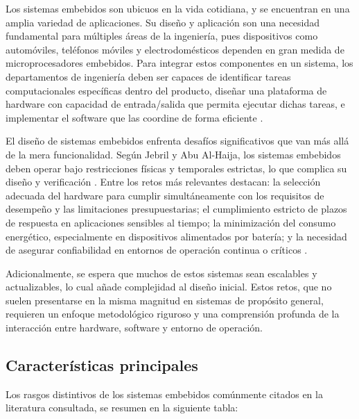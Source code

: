 Los sistemas embebidos son ubicuos en la vida cotidiana, y se encuentran en una amplia variedad de aplicaciones. Su diseño y aplicación son una necesidad fundamental para múltiples áreas de la ingeniería, pues dispositivos como automóviles, teléfonos móviles y electrodomésticos dependen en gran medida de microprocesadores embebidos. Para integrar estos componentes en un sistema, los departamentos de ingeniería deben ser capaces de identificar tareas computacionales específicas dentro del producto, diseñar una plataforma de hardware con capacidad de entrada/salida que permita ejecutar dichas tareas, e implementar el software que las coordine de forma eficiente \cite{wolf_embedded_2012}. 

El diseño de sistemas embebidos enfrenta desafíos significativos que van más allá de la mera funcionalidad. Según Jebril y Abu Al-Haija, los sistemas embebidos deben operar bajo restricciones físicas y temporales estrictas, lo que complica su diseño y verificación \cite{jebril_challenges_2017}. Entre los retos más relevantes destacan: la selección adecuada del hardware para cumplir simultáneamente con los requisitos de desempeño y las limitaciones presupuestarias; el cumplimiento estricto de plazos de respuesta en aplicaciones sensibles al tiempo; la minimización del consumo energético, especialmente en dispositivos alimentados por batería; y la necesidad de asegurar confiabilidad en entornos de operación continua o críticos \cite{wolf_embedded_2012}.  

Adicionalmente, se espera que muchos de estos sistemas sean escalables y actualizables, lo cual añade complejidad al diseño inicial. Estos retos, que no suelen presentarse en la misma magnitud en sistemas de propósito general, requieren un enfoque metodológico riguroso y una comprensión profunda de la interacción entre hardware, software y entorno de operación.

\subsection{Características principales}

Los rasgos distintivos de los sistemas embebidos comúnmente citados en la literatura consultada, se resumen en la siguiente tabla: 


